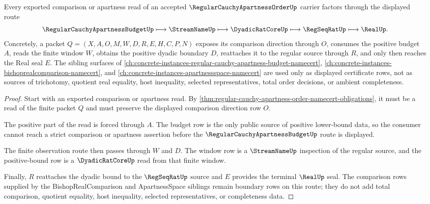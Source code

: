 \begin{theorem}
\label{thm:regular-cauchy-apartness-order-positive-boundary}
Every exported comparison or apartness read of an accepted $\RegularCauchyApartnessOrderUp$ carrier factors through the displayed route
$$
\RegularCauchyApartnessBudgetUp \longmapsto \StreamNameUp \longmapsto \DyadicRatCoreUp \longmapsto \RegSeqRatUp \longmapsto \RealUp .
$$
Concretely, a packet $Q=(X,A,O,M,W,D,R,E,H,C,P,N)$ exposes its comparison direction through $O$, consumes the positive budget $A$, reads the finite window $W$, obtains the positive dyadic boundary $D$, reattaches it to the regular source through $R$, and only then reaches the Real seal $E$. The sibling surfaces of \autoref{ch:concrete-instances-regular-cauchy-apartness-budget-namecert}, \autoref{ch:concrete-instances-bishoprealcomparison-namecert}, and \autoref{ch:concrete-instances-apartnessspace-namecert} are used only as displayed certificate rows, not as sources of trichotomy, quotient real equality, host inequality, selected representatives, total order decisions, or ambient completeness.
\end{theorem}
\begin{proof}
Start with an exported comparison or apartness read. By \autoref{thm:regular-cauchy-apartness-order-namecert-obligations}, it must be a read of the finite packet $Q$ and must preserve the displayed comparison direction row $O$.

The positive part of the read is forced through $A$. The budget row is the only public source of positive lower-bound data, so the consumer cannot reach a strict comparison or apartness assertion before the $\RegularCauchyApartnessBudgetUp$ route is displayed.

The finite observation route then passes through $W$ and $D$. The window row is a $\StreamNameUp$ inspection of the regular source, and the positive-bound row is a $\DyadicRatCoreUp$ read from that finite window.

Finally, $R$ reattaches the dyadic bound to the $\RegSeqRatUp$ source and $E$ provides the terminal $\RealUp$ seal. The comparison rows supplied by the BishopRealComparison and ApartnessSpace siblings remain boundary rows on this route; they do not add total comparison, quotient equality, host inequality, selected representatives, or completeness data.
\end{proof}

